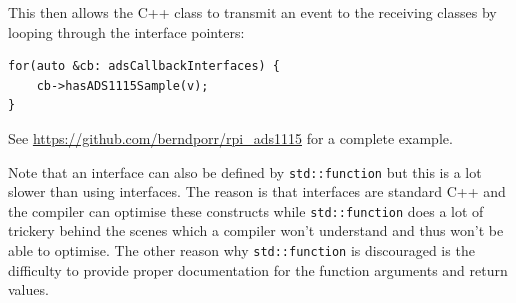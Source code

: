 \documentclass[12pt]{report}
\begin{document}
This then allows the C++ class to transmit an event to the receiving classes by looping through
the interface pointers:
\begin{verbatim}
for(auto &cb: adsCallbackInterfaces) {
    cb->hasADS1115Sample(v);
}
\end{verbatim}

See \url{https://github.com/berndporr/rpi_ads1115} for a complete example.

Note that an interface can also be defined by \texttt{std::function} but this is a lot
slower than using interfaces. The reason is that interfaces are standard C++ and the
compiler can optimise these constructs while \texttt{std::function} does a lot of trickery
behind the scenes which a compiler won't understand and thus won't be able to optimise.
The other reason why \texttt{std::function} is discouraged is the difficulty to provide
proper documentation for the function arguments and return values.
\end{document}
